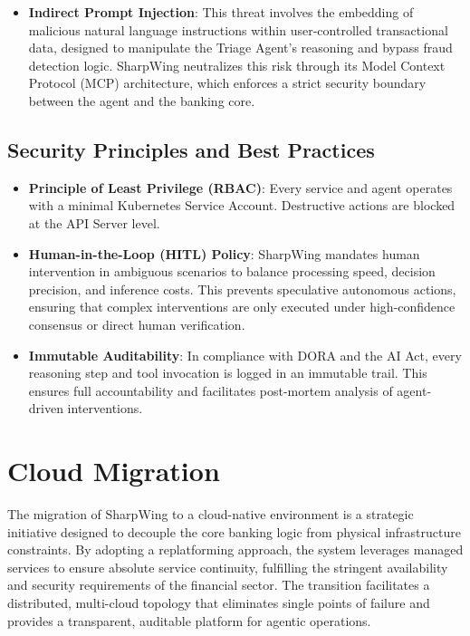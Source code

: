\documentclass[12pt]{report}
\begin{document}
\begin{itemize}
     \item \textbf{Indirect Prompt Injection}: This threat involves the embedding of malicious natural language instructions within user-controlled transactional data, designed to manipulate the Triage Agent's reasoning and bypass fraud detection logic. SharpWing neutralizes this risk through its Model Context Protocol (MCP) architecture, which enforces a strict security boundary between the agent and the banking core.
\end{itemize}

\vspace{4cm}

\section{Security Principles and Best Practices}

\begin{itemize}
    \item \textbf{Principle of Least Privilege (RBAC)}: Every service and agent operates with a minimal Kubernetes Service Account. Destructive actions are blocked at the API Server level.
    
    \item \textbf{Human-in-the-Loop (HITL) Policy}: SharpWing mandates human intervention in ambiguous scenarios to balance processing speed, decision precision, and inference costs. This prevents speculative autonomous actions, ensuring that complex interventions are only executed under high-confidence consensus or direct human verification.
    
    \item \textbf{Immutable Auditability}: In compliance with DORA and the AI Act, every reasoning step and tool invocation is logged in an immutable trail. This ensures full accountability and facilitates post-mortem analysis of agent-driven interventions.
\end{itemize}

\chapter{Cloud Migration}
\label{ch:cloud_migration}

The migration of SharpWing to a cloud-native environment is a strategic initiative designed to decouple the core banking logic from physical infrastructure constraints. By adopting a replatforming approach, the system leverages managed services to ensure absolute service continuity, fulfilling the stringent availability and security requirements of the financial sector. The transition facilitates a distributed, multi-cloud topology that eliminates single points of failure and provides a transparent, auditable platform for agentic operations.
\end{document}
